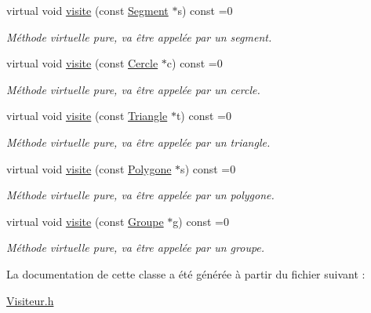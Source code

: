 \begin{DoxyCompactItemize}
\item 
\mbox{\label{class_visiteur_ab63ea127a0ac3cfa12c4cbdd9d9c8eb2}} 
virtual void \mbox{\hyperlink{class_visiteur_ab63ea127a0ac3cfa12c4cbdd9d9c8eb2}{visite}} (const \mbox{\hyperlink{class_segment}{Segment}} $\ast$s) const =0
\begin{DoxyCompactList}\small\item\em Méthode virtuelle pure, va être appelée par un segment. \end{DoxyCompactList}\item 
\mbox{\label{class_visiteur_a0af8611572f009ff37b9429facc7eaec}} 
virtual void \mbox{\hyperlink{class_visiteur_a0af8611572f009ff37b9429facc7eaec}{visite}} (const \mbox{\hyperlink{class_cercle}{Cercle}} $\ast$c) const =0
\begin{DoxyCompactList}\small\item\em Méthode virtuelle pure, va être appelée par un cercle. \end{DoxyCompactList}\item 
\mbox{\label{class_visiteur_a65332165fada93947fbad9a4d9eebf2c}} 
virtual void \mbox{\hyperlink{class_visiteur_a65332165fada93947fbad9a4d9eebf2c}{visite}} (const \mbox{\hyperlink{class_triangle}{Triangle}} $\ast$t) const =0
\begin{DoxyCompactList}\small\item\em Méthode virtuelle pure, va être appelée par un triangle. \end{DoxyCompactList}\item 
\mbox{\label{class_visiteur_a0a7c596d84a8750e3a670330a1001538}} 
virtual void \mbox{\hyperlink{class_visiteur_a0a7c596d84a8750e3a670330a1001538}{visite}} (const \mbox{\hyperlink{class_polygone}{Polygone}} $\ast$s) const =0
\begin{DoxyCompactList}\small\item\em Méthode virtuelle pure, va être appelée par un polygone. \end{DoxyCompactList}\item 
\mbox{\label{class_visiteur_a812aa03fad51d8aec386f8df7f9b5353}} 
virtual void \mbox{\hyperlink{class_visiteur_a812aa03fad51d8aec386f8df7f9b5353}{visite}} (const \mbox{\hyperlink{class_groupe}{Groupe}} $\ast$g) const =0
\begin{DoxyCompactList}\small\item\em Méthode virtuelle pure, va être appelée par un groupe. \end{DoxyCompactList}\end{DoxyCompactItemize}


La documentation de cette classe a été générée à partir du fichier suivant \+:\begin{DoxyCompactItemize}
\item 
\mbox{\hyperlink{_visiteur_8h}{Visiteur.\+h}}\end{DoxyCompactItemize}
